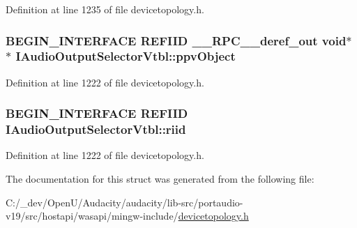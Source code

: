 Definition at line 1235 of file devicetopology.\+h.

\subsubsection[{\texorpdfstring{ppv\+Object}{ppvObject}}]{\setlength{\rightskip}{0pt plus 5cm}B\+E\+G\+I\+N\+\_\+\+I\+N\+T\+E\+R\+F\+A\+CE {\bf R\+E\+F\+I\+ID} {\bf \+\_\+\+\_\+\+R\+P\+C\+\_\+\+\_\+deref\+\_\+out} {\bf void}$\ast$$\ast$ I\+Audio\+Output\+Selector\+Vtbl\+::ppv\+Object}\hypertarget{struct_i_audio_output_selector_vtbl_a8a1a1e0775c4e1264fafc4191b275300}{}\label{struct_i_audio_output_selector_vtbl_a8a1a1e0775c4e1264fafc4191b275300}


Definition at line 1222 of file devicetopology.\+h.

\subsubsection[{\texorpdfstring{riid}{riid}}]{\setlength{\rightskip}{0pt plus 5cm}B\+E\+G\+I\+N\+\_\+\+I\+N\+T\+E\+R\+F\+A\+CE {\bf R\+E\+F\+I\+ID} I\+Audio\+Output\+Selector\+Vtbl\+::riid}\hypertarget{struct_i_audio_output_selector_vtbl_a1f49a46ec49b5e63aab34ba778b61bc4}{}\label{struct_i_audio_output_selector_vtbl_a1f49a46ec49b5e63aab34ba778b61bc4}


Definition at line 1222 of file devicetopology.\+h.



The documentation for this struct was generated from the following file\+:\begin{DoxyCompactItemize}
\item 
C\+:/\+\_\+dev/\+Open\+U/\+Audacity/audacity/lib-\/src/portaudio-\/v19/src/hostapi/wasapi/mingw-\/include/\hyperlink{devicetopology_8h}{devicetopology.\+h}\end{DoxyCompactItemize}
